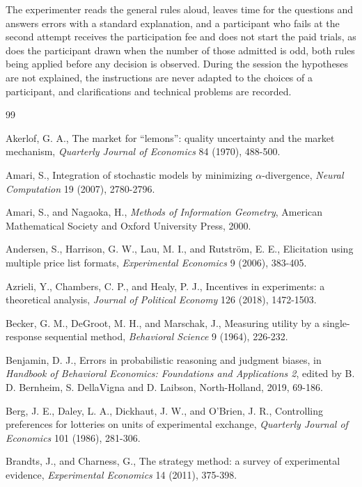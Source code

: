\documentclass[11pt,a4paper]{article}
\begin{document}
The experimenter reads the general rules aloud, leaves time for the questions and answers errors with a standard explanation, and a participant who fails at the second attempt receives the participation fee and does not start the paid trials, as does the participant drawn when the number of those admitted is odd, both rules being applied before any decision is observed. During the session the hypotheses are not explained, the instructions are never adapted to the choices of a participant, and clarifications and technical problems are recorded.

{\small
\begin{thebibliography}{99}
\setlength{\itemsep}{0pt}
\setlength{\parskip}{0pt}

 Akerlof, G. A., The market for ``lemons'': quality uncertainty and the market mechanism, \emph{Quarterly Journal of Economics} 84 (1970), 488-500.

 Amari, S., Integration of stochastic models by minimizing $\alpha$-divergence, \emph{Neural Computation} 19 (2007), 2780-2796.

 Amari, S., and Nagaoka, H., \emph{Methods of Information Geometry}, American Mathematical Society and Oxford University Press, 2000.

 Andersen, S., Harrison, G. W., Lau, M. I., and Rutstr\"om, E. E., Elicitation using multiple price list formats, \emph{Experimental Economics} 9 (2006), 383-405.

 Azrieli, Y., Chambers, C. P., and Healy, P. J., Incentives in experiments: a theoretical analysis, \emph{Journal of Political Economy} 126 (2018), 1472-1503.

 Becker, G. M., DeGroot, M. H., and Marschak, J., Measuring utility by a single-response sequential method, \emph{Behavioral Science} 9 (1964), 226-232.

 Benjamin, D. J., Errors in probabilistic reasoning and judgment biases, in \emph{Handbook of Behavioral Economics: Foundations and Applications 2}, edited by B. D. Bernheim, S. DellaVigna and D. Laibson, North-Holland, 2019, 69-186.

 Berg, J. E., Daley, L. A., Dickhaut, J. W., and O'Brien, J. R., Controlling preferences for lotteries on units of experimental exchange, \emph{Quarterly Journal of Economics} 101 (1986), 281-306.

 Brandts, J., and Charness, G., The strategy method: a survey of experimental evidence, \emph{Experimental Economics} 14 (2011), 375-398.


\end{thebibliography}}
\end{document}
